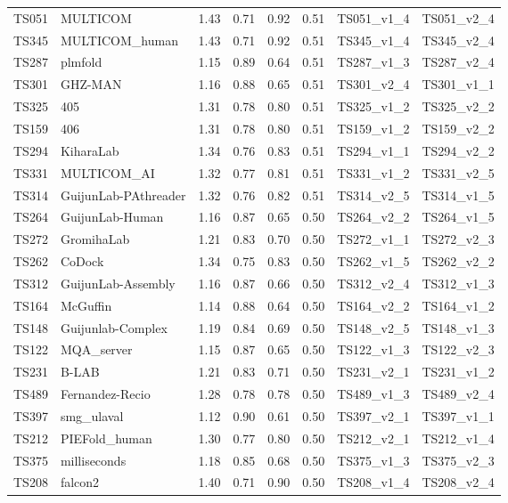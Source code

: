 \begin{longtable}{llllllll}
TS051 & MULTICOM & 1.43 & 0.71 & 0.92 & 0.51 & TS051\_v1\_4 & TS051\_v2\_4 \\ 
TS345 & MULTICOM\_human & 1.43 & 0.71 & 0.92 & 0.51 & TS345\_v1\_4 & TS345\_v2\_4 \\ 
TS287 & plmfold & 1.15 & 0.89 & 0.64 & 0.51 & TS287\_v1\_3 & TS287\_v2\_4 \\ 
TS301 & GHZ-MAN & 1.16 & 0.88 & 0.65 & 0.51 & TS301\_v2\_4 & TS301\_v1\_1 \\ 
TS325 & 405 & 1.31 & 0.78 & 0.80 & 0.51 & TS325\_v1\_2 & TS325\_v2\_2 \\ 
TS159 & 406 & 1.31 & 0.78 & 0.80 & 0.51 & TS159\_v1\_2 & TS159\_v2\_2 \\ 
TS294 & KiharaLab & 1.34 & 0.76 & 0.83 & 0.51 & TS294\_v1\_1 & TS294\_v2\_2 \\ 
TS331 & MULTICOM\_AI & 1.32 & 0.77 & 0.81 & 0.51 & TS331\_v1\_2 & TS331\_v2\_5 \\ 
TS314 & GuijunLab-PAthreader & 1.32 & 0.76 & 0.82 & 0.51 & TS314\_v2\_5 & TS314\_v1\_5 \\ 
TS264 & GuijunLab-Human & 1.16 & 0.87 & 0.65 & 0.50 & TS264\_v2\_2 & TS264\_v1\_5 \\ 
TS272 & GromihaLab & 1.21 & 0.83 & 0.70 & 0.50 & TS272\_v1\_1 & TS272\_v2\_3 \\ 
TS262 & CoDock & 1.34 & 0.75 & 0.83 & 0.50 & TS262\_v1\_5 & TS262\_v2\_2 \\ 
TS312 & GuijunLab-Assembly & 1.16 & 0.87 & 0.66 & 0.50 & TS312\_v2\_4 & TS312\_v1\_3 \\ 
TS164 & McGuffin & 1.14 & 0.88 & 0.64 & 0.50 & TS164\_v2\_2 & TS164\_v1\_2 \\ 
TS148 & Guijunlab-Complex & 1.19 & 0.84 & 0.69 & 0.50 & TS148\_v2\_5 & TS148\_v1\_3 \\ 
TS122 & MQA\_server & 1.15 & 0.87 & 0.65 & 0.50 & TS122\_v1\_3 & TS122\_v2\_3 \\ 
TS231 & B-LAB & 1.21 & 0.83 & 0.71 & 0.50 & TS231\_v2\_1 & TS231\_v1\_2 \\ 
TS489 & Fernandez-Recio & 1.28 & 0.78 & 0.78 & 0.50 & TS489\_v1\_3 & TS489\_v2\_4 \\ 
TS397 & smg\_ulaval & 1.12 & 0.90 & 0.61 & 0.50 & TS397\_v2\_1 & TS397\_v1\_1 \\ 
TS212 & PIEFold\_human & 1.30 & 0.77 & 0.80 & 0.50 & TS212\_v2\_1 & TS212\_v1\_4 \\ 
TS375 & milliseconds & 1.18 & 0.85 & 0.68 & 0.50 & TS375\_v1\_3 & TS375\_v2\_3 \\ 
TS208 & falcon2 & 1.40 & 0.71 & 0.90 & 0.50 & TS208\_v1\_4 & TS208\_v2\_4 \\ 

\end{longtable}
